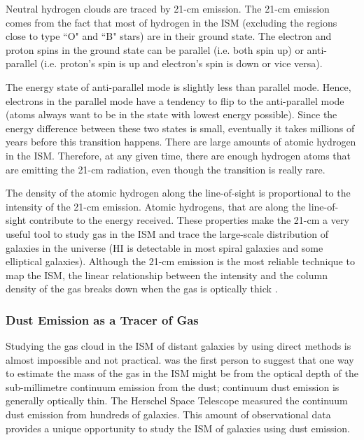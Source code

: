 Neutral hydrogen clouds are traced by 21-cm emission. The 21-cm emission comes from the fact that most of hydrogen in the ISM (excluding the regions close to type ``O" and ``B" stars) are in their ground state. The electron and proton spins in the ground state can be parallel (i.e. both spin up) or anti-parallel (i.e. proton's spin is up and electron's spin is down or vice versa). 

The energy state of anti-parallel mode is slightly less than parallel mode. Hence, electrons in the parallel mode have a tendency to flip to the anti-parallel mode (atoms always want to be in the state with lowest energy possible). Since the energy difference between these two states is small, eventually it takes millions of years before this transition happens. There are large amounts of atomic hydrogen in the ISM. Therefore, at any given time, there are enough hydrogen atoms that are emitting the 21-cm radiation, even though the transition is really rare. 

The density of the atomic hydrogen along the line-of-sight is proportional to the intensity of the 21-cm emission. Atomic hydrogens, that are along the line-of-sight contribute to the energy received. These properties make the 21-cm a very useful tool to study gas in the ISM and trace the large-scale distribution of galaxies in the universe (HI is detectable in most spiral galaxies and some elliptical galaxies). Although the 21-cm emission is the most reliable technique to map the ISM, the linear relationship between the intensity and the column density of the gas breaks down when the gas is optically thick \citep{Braun09}.

\subsubsection{Dust Emission as a Tracer of Gas}

Studying the gas cloud in the ISM of distant galaxies by using direct methods is almost impossible and not practical. \cite{Hildebran83} was the first person to suggest that one way to estimate the mass of the gas in the ISM might be from the optical depth of the sub-millimetre continuum emission from the dust; continuum dust emission is generally optically thin. The Herschel Space Telescope \cite{Pilbratt10} measured the continuum dust emission from hundreds of galaxies\citep{Eales10, Oliver12}. This amount of observational data provides a unique opportunity to study the ISM of galaxies using dust emission. 

